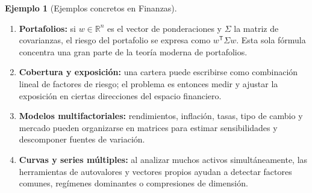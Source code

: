 \documentclass[10pt,a4paper,oneside]{article}
\theoremstyle{plain}
\theoremstyle{definition}
\newtheorem{example}[theorem]{Ejemplo}
\theoremstyle{remark}
\newcommand{\R}{\mathbb{R}}
\begin{document}
\begin{example}[Ejemplos concretos en Finanzas]
\begin{enumerate}[label=\textup{(\arabic*)}]
\item \textbf{Portafolios:} si $w\in\R^n$ es el vector de ponderaciones y $\Sigma$ la matriz de covarianzas, el riesgo del portafolio se expresa como $w^{\mathsf T}\Sigma w$. Esta sola fórmula concentra una gran parte de la teoría moderna de portafolios.
\item \textbf{Cobertura y exposición:} una cartera puede escribirse como combinación lineal de factores de riesgo; el problema es entonces medir y ajustar la exposición en ciertas direcciones del espacio financiero.
\item \textbf{Modelos multifactoriales:} rendimientos, inflación, tasas, tipo de cambio y mercado pueden organizarse en matrices para estimar sensibilidades y descomponer fuentes de variación.
\item \textbf{Curvas y series múltiples:} al analizar muchos activos simultáneamente, las herramientas de autovalores y vectores propios ayudan a detectar factores comunes, regímenes dominantes o compresiones de dimensión.
\end{enumerate}
\end{example}

\begin{center}
\vspace{0.4em}
\vspace{0.45em}
\end{center}
\end{document}
